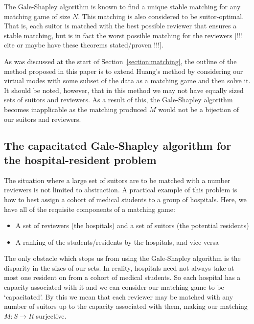 The Gale-Shapley algorithm is known to find a unique stable matching for any 
matching game of size \(N\). This matching is also considered to be 
suitor-optimal. That is, each suitor is matched with the best possible reviewer
that ensures a stable matching, but is in fact the worst possible matching for 
the reviewers [!!! cite or maybe have these theorems stated/proven !!!]. 

As was discussed at the start of Section~\ref{section:matching}, the outline of
the method proposed in this paper is to extend Huang's method by considering our
virtual modes with some subset of the data as a matching game and then solve it.
It should be noted, however, that in this method we may not have equally sized 
sets of suitors and reviewers. As a result of this, the Gale-Shapley algorithm 
becomes inapplicable as the matching produced \(M\) would not be a bijection of 
our suitors and reviewers.

\subsection{The capacitated Gale-Shapley algorithm for the hospital-resident 
		problem}\label{subsection:capacitated-galeshapley}

The situation where a large set of suitors are to be matched with a number
reviewers is not limited to abstraction. A practical example of this problem is
how to best assign a cohort of medical students to a group of hospitals. Here, 
we have all of the requisite components of a matching game:

\begin{itemize}
	\item A set of reviewers (the hospitals) and a set of suitors (the potential
        residents) 
	\item A ranking of the students/residents by the hospitals, and vice versa
\end{itemize}

The only obstacle which stops us from using the Gale-Shapley algorithm is the 
disparity in the sizes of our sets. In reality, hospitals need not always take 
at most one resident on from a cohort of medical students. So each hospital has
a capacity associated with it and we can consider our matching game to be
`capacitated'. By this we mean that each reviewer may be matched with any number
of suitors up to the capacity associated with them, making our matching \(M: S 
\to R\) surjective. \\

